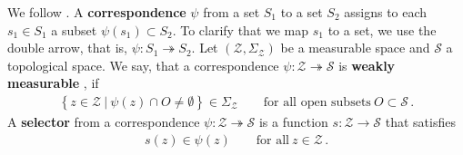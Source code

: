 We follow \cite{Aliprantis2007}.
A \textbf{correspondence} $\psi$ from a set $S_1$ to a set $S_2$ assigns to each $s_1\in S_1$ a subset $\psi(s_1)\subset S_2$.
To clarify that we map $s_1$ to a set, we use the double arrow, that is,
$
  \psi
  \colon
  S_1
  \twoheadrightarrow
  S_2
$.
  Let 
  $(\mathcal{Z},\Sigma_{\mathcal{Z}})$ be a measurable space and $\mathcal{S}$  a topological space.
  We say, that a correspondence 
  $
  \psi
  \colon
  \mathcal{Z}
  \twoheadrightarrow
  \mathcal{S}
  $
  is 
  \textbf{
  weakly measurable
  },
  if
  \begin{gather*}
    \left\{ 
      z\in \mathcal{Z}
      \ 
      |
      \ 
      \psi(z)
      \cap
      O
      \neq
      \emptyset
    \right\}
    \in
    \Sigma_{\mathcal{Z}}
    \qquad
    \text{for all open subsets}
    \ 
    O\subset \mathcal{S}
    \,.
  \end{gather*}
  A \textbf{selector} from a correspondence $\psi\colon \mathcal{Z}\twoheadrightarrow \mathcal{S}$ is a function $s\colon \mathcal{Z}\to \mathcal{S}$ that satisfies 
  \begin{align*}
s(z)\in\psi(z)
\qquad
\text{for all}\ 
z\in\mathcal{Z}
\,.
  \end{align*}
  

